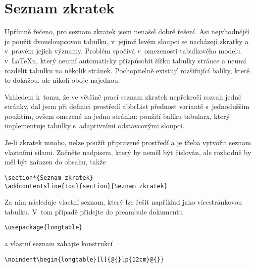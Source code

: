 \documentclass[FF,fonts]{tulthesis}
\newcommand{\argument}[1]{{\ttfamily\color{\tulcolor}#1}}
\newenvironment{myquote}{\begin{list}{}{\setlength\leftmargin\parindent}\item[]}{\end{list}}
\newenvironment{listing}{\begin{myquote}\color{\tulcolor}}{\end{myquote}}
\begin{document}
\section{Seznam zkratek}\label{zkratky}

Upřímně řečeno, pro seznam zkratek jsem nenašel dobré řešení. Asi nejvhodnější
je použít dvousloupcovou tabulku, v~jejímž levém sloupci se nacházejí zkratky a
v~pravém jejich významy. Problém spočívá v~omezenosti tabulkového modelu
v~\LaTeX u, který neumí automaticky přizpůsobit šířku tabulky stránce a neumí
rozdělit tabulku na několik stránek. Pochopitelně existují rozšiřující balíky,
které to dokážou, ale nikoli oboje najednou.

Vzhledem k~tomu, že ve většině prací seznam zkratek nepřekročí rozsah jedné
stránky, dal jsem při definici prostředí \argument{abbrList} přednost variantě
s~jednodušším použitím, ovšem omezené na jednu stránku: použití balíku
\argument{tabularx}, který implementuje tabulky s~adaptivními odstavcovými
sloupci.

Je-li zkratek mnoho, nelze použít připravené prostředí a je třeba vytvořit
seznam vlastními silami. Začněte nadpisem, který by neměl být číslován, ale
rozhodně by měl být zařazen do obsahu, takže

\begin{listing}
\begin{verbatim}
\section*{Seznam zkratek}
\addcontentsline{toc}{section}{Seznam zkratek}
\end{verbatim}
\end{listing}

Za ním následuje vlastní seznam, který lze řešit například jako vícestránkovou
tabulku. V~tom případě přidejte do preambule dokumentu

\begin{listing}
\begin{verbatim}
\usepackage{longtable}
\end{verbatim}
\end{listing}

a vlastní seznam zahajte konstrukcí

\begin{listing}
\begin{verbatim}
\noindent\begin{longtable}[l]{@{}lp{12cm}@{}}
\end{verbatim}
\end{listing}
\end{document}
